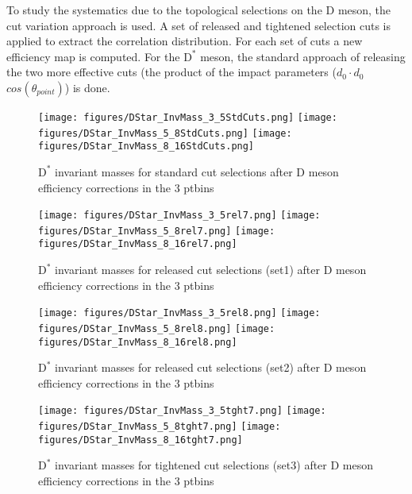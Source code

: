 To study the systematics due to the topological selections on the D meson, the cut variation approach is used. A set of released and tightened selection cuts is applied to extract the correlation distribution. For each set of cuts a new efficiency map is computed. For the  $\text{D}^*$ meson, the standard approach of releasing the two more effective cuts (the product of the impact parameters ($d_{0} \cdot d_{0}$  $cos\left(\theta_{point}\right)$) is done.

\begin{figure}[h]
\centering
{\texttt{[image: figures/DStar\_InvMass\_3\_5StdCuts.png]}}
{\texttt{[image: figures/DStar\_InvMass\_5\_8StdCuts.png]}}
{\texttt{[image: figures/DStar\_InvMass\_8\_16StdCuts.png]}}
 \caption{$\text{D}^*$ invariant masses for standard cut selections after D meson efficiency corrections in the 3 ptbins}
\label{fig:Syst_DStarMassStd}
\end{figure}
\begin{figure}[h]
\centering
{\texttt{[image: figures/DStar\_InvMass\_3\_5rel7.png]}}
{\texttt{[image: figures/DStar\_InvMass\_5\_8rel7.png]}}
{\texttt{[image: figures/DStar\_InvMass\_8\_16rel7.png]}}
 \caption{$\text{D}^*$ invariant masses for released cut selections (set1) after D meson efficiency corrections in the 3 ptbins}
\label{fig:Syst_DStarMassrel7}
\end{figure}
\begin{figure}[h]
\centering
{\texttt{[image: figures/DStar\_InvMass\_3\_5rel8.png]}}
{\texttt{[image: figures/DStar\_InvMass\_5\_8rel8.png]}}
{\texttt{[image: figures/DStar\_InvMass\_8\_16rel8.png]}}
 \caption{$\text{D}^*$ invariant masses for released cut selections (set2) after D meson efficiency corrections in the 3 ptbins}
\label{fig:Syst_DStarMassrel8}
\end{figure}

\begin{figure}
\centering
{\texttt{[image: figures/DStar\_InvMass\_3\_5tght7.png]}}
{\texttt{[image: figures/DStar\_InvMass\_5\_8tght7.png]}}
{\texttt{[image: figures/DStar\_InvMass\_8\_16tght7.png]}}
 \caption{$\text{D}^*$ invariant masses for tightened cut selections (set3) after D meson efficiency corrections in the 3 ptbins}
\label{fig:Syst_DStarMasstght7}
\end{figure}

